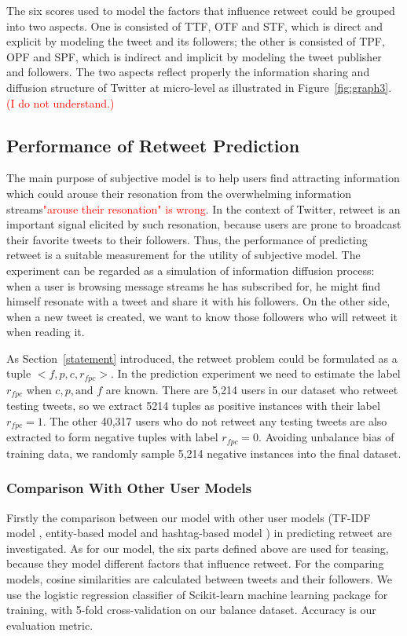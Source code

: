 \documentclass{acm_proc_article-sp}
\newcommand{\mo}[1]{\textcolor{red}{#1}}
\begin{document}
The six scores used to model the factors that influence retweet could be grouped into two aspects. 
One is consisted of TTF, OTF and STF, which is direct and explicit by modeling the tweet and its followers;
the other is consisted of TPF, OPF and SPF, which is indirect and implicit by modeling the tweet publisher and followers.
The two aspects reflect properly the information sharing and diffusion structure of Twitter at micro-level as illustrated in Figure~\ref{fig:graph3}. \mo{(I do not understand.)}

\subsection{Performance of Retweet Prediction }
\label{performance}
The main purpose of subjective model is to help users find attracting information which could arouse their resonation from the overwhelming information streams\mo{"arouse their resonation" is wrong}. 
In the context of Twitter, retweet is an important signal elicited by such resonation, because users are prone to broadcast their favorite tweets to their followers. 
Thus, the performance of predicting retweet is a suitable measurement for the utility of subjective model. The experiment can be regarded as a simulation of information diffusion process: when a user is browsing message streams he has subscribed for, he might find himself resonate with a tweet and share it with his followers. On the other side, when a new tweet is created, we want to know those followers who will retweet it when reading it.

As Section~\ref{statement} introduced, the retweet problem could be formulated as a tuple $< f, p, c, r_{fpc}> $.
In the prediction experiment we need to estimate the label $ r_{fpc} $ when $ c, p, \text{and } f $ are known. 
There are 5,214 users in our dataset who retweet testing tweets, so we extract 5214 tuples as positive instances with their label $ r_{fpc}=1 $.
The other 40,317 users who do not retweet any testing tweets are also extracted to form negative tuples with label $ r_{fpc}=0 $.
Avoiding unbalance bias of training data, we randomly sample 5,214 negative instances into the final dataset.

\subsubsection{Comparison With Other User Models}
\label{comparison}
Firstly the comparison between our model with other user models (TF-IDF model \cite{Luo:2013RMF}, entity-based model and hashtag-based model \cite{Abel:2011AUM}) in predicting retweet are investigated.
As for our model, the six parts defined above are used for teasing, because they model different factors that influence retweet.
For the comparing models, cosine similarities are calculated between tweets and their followers.
We use the logistic regression classifier of Scikit-learn machine learning package \cite{scikit-learn} for training, with 5-fold cross-validation on our balance dataset. Accuracy is our evaluation metric.
\end{document}
